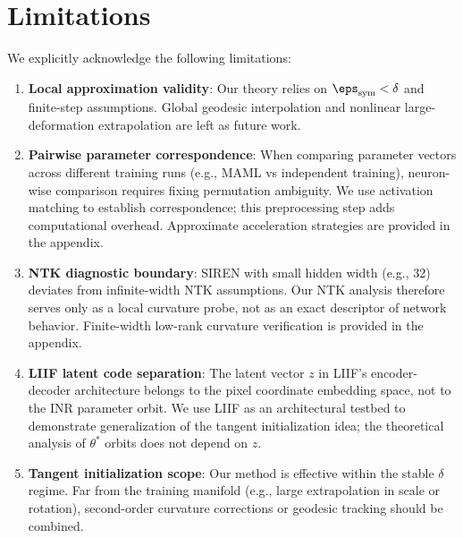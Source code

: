\section{Limitations}
\label{sec:limitations}

We explicitly acknowledge the following limitations:

\begin{enumerate}
    \item \textbf{Local approximation validity}: Our theory relies on $\eps_{\mathrm{sym}} < \delta$ and finite-step assumptions. Global geodesic interpolation and nonlinear large-deformation extrapolation are left as future work.

    \item \textbf{Pairwise parameter correspondence}: When comparing parameter vectors across different training runs (e.g., MAML vs independent training), neuron-wise comparison requires fixing permutation ambiguity. We use activation matching to establish correspondence; this preprocessing step adds computational overhead. Approximate acceleration strategies are provided in the appendix.

    \item \textbf{NTK diagnostic boundary}: SIREN with small hidden width (e.g., 32) deviates from infinite-width NTK assumptions. Our NTK analysis therefore serves only as a local curvature probe, not as an exact descriptor of network behavior. Finite-width low-rank curvature verification is provided in the appendix.

    \item \textbf{LIIF latent code separation}: The latent vector $z$ in LIIF's encoder-decoder architecture belongs to the pixel coordinate embedding space, not to the INR parameter orbit. We use LIIF as an architectural testbed to demonstrate generalization of the tangent initialization idea; the theoretical analysis of $\theta^*$ orbits does not depend on $z$.

    \item \textbf{Tangent initialization scope}: Our method is effective within the stable $\delta$ regime. Far from the training manifold (e.g., large extrapolation in scale or rotation), second-order curvature corrections or geodesic tracking should be combined.
\end{enumerate}


